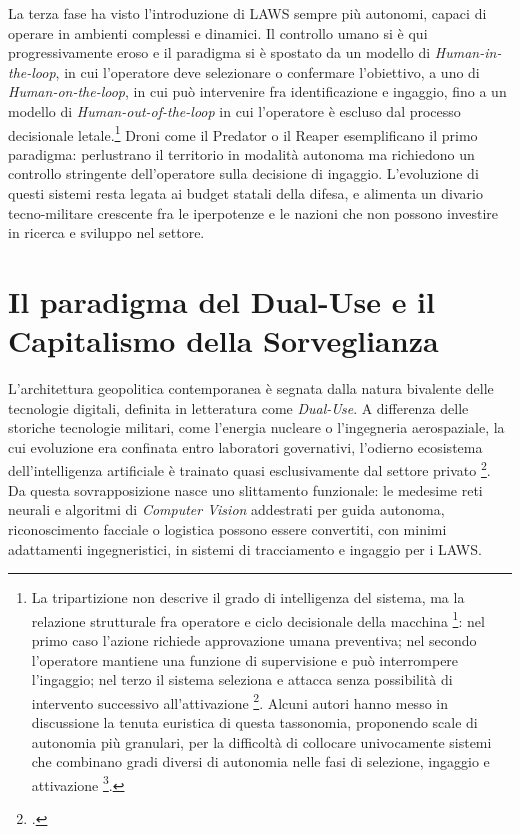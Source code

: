 \documentclass[a4paper,12pt]{report}
\begin{document}
La terza fase ha visto l'introduzione di LAWS sempre più autonomi, capaci di
operare in ambienti complessi e dinamici. Il controllo umano si è qui
progressivamente eroso e il paradigma si è spostato da un modello di
\textit{Human-in-the-loop}, in cui l'operatore deve selezionare o confermare
l'obiettivo, a uno di \textit{Human-on-the-loop}, in cui può intervenire fra
identificazione e ingaggio, fino a un modello di \textit{Human-out-of-the-loop}
in cui l'operatore è escluso dal processo decisionale letale.\footnote{La
tripartizione non descrive il grado di intelligenza del sistema, ma la relazione
strutturale fra operatore e ciclo decisionale della macchina
\footcite{horowitz_scharre_2015}: nel primo caso l'azione richiede approvazione
umana preventiva; nel secondo l'operatore mantiene una funzione di supervisione
e può interrompere l'ingaggio; nel terzo il sistema seleziona e attacca senza
possibilità di intervento successivo all'attivazione \footcite{kallenborn_2021}.
Alcuni autori hanno messo in discussione la tenuta euristica di questa
tassonomia, proponendo scale di autonomia più granulari, per la difficoltà di
collocare univocamente sistemi che combinano gradi diversi di autonomia nelle
fasi di selezione, ingaggio e attivazione \footcite{sharkey_2016}.} Droni come
il Predator o il Reaper esemplificano il primo paradigma: perlustrano il
territorio in modalità autonoma ma richiedono un controllo stringente
dell'operatore sulla decisione di ingaggio. L'evoluzione di questi sistemi resta
legata ai budget statali della difesa, e alimenta un divario tecno-militare
crescente fra le iperpotenze e le nazioni che non possono investire in ricerca e
sviluppo nel settore.
 
\section{Il paradigma del Dual-Use e il Capitalismo della Sorveglianza}
 
L'architettura geopolitica contemporanea è segnata dalla natura bivalente delle
tecnologie digitali, definita in letteratura come \textit{Dual-Use}. A
differenza delle storiche tecnologie militari, come l'energia nucleare o
l'ingegneria aerospaziale, la cui evoluzione era confinata entro laboratori
governativi, l'odierno ecosistema dell'intelligenza artificiale è trainato quasi
esclusivamente dal settore privato \footcite{longpre_2022}. Da questa
sovrapposizione nasce uno slittamento funzionale: le medesime reti neurali e
algoritmi di \textit{Computer Vision} addestrati per guida autonoma,
riconoscimento facciale o logistica possono essere convertiti, con minimi
adattamenti ingegneristici, in sistemi di tracciamento e ingaggio per i LAWS.
 
\end{document}
